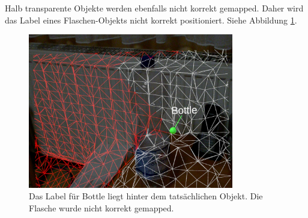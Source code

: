 Halb transparente Objekte werden ebenfalls nicht korrekt gemapped. Daher wird das Label eines Flaschen-Objekts nicht korrekt positioniert. Siehe Abbildung \ref{img:flasche}.

\begin{figure}[H]
	\centering
	\includegraphics[width=0.8\textwidth]{images/ML_20201004_19.12.13.jpg}
	\caption[Spatial Mapping Transparenter Objekte]{Das Label für Bottle liegt hinter dem tatsächlichen Objekt. Die Flasche wurde nicht korrekt gemapped.}
	\label{img:flasche}
\end{figure}
